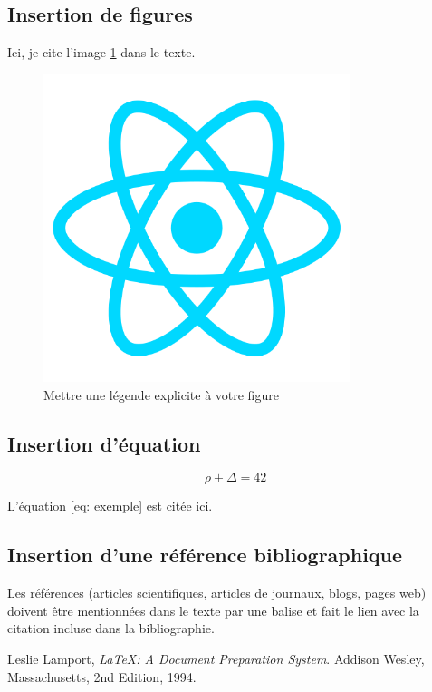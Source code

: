 \documentclass{rapportCS}
\begin{document}
\subsection{Insertion de figures}
Ici, je cite l'image \ref{fig:my_label} dans le texte.
\begin{figure}[h!]
    \centering
    \includegraphics[width=0.8\textwidth]{logos/react.png}
    \caption{Mettre une légende explicite à votre figure}
    \label{fig:my_label}
\end{figure}

\subsection{Insertion d'équation}

\begin{equation} \label{eq: exemple}
\rho + \Delta = 42
\end{equation}

L'équation \ref{eq: exemple} est citée ici. 

\subsection{Insertion d'une référence bibliographique}
Les références (articles scientifiques, articles de journaux, blogs, pages web) doivent être mentionnées dans le texte par une balise \cite{maref} et fait le lien avec la citation incluse dans la bibliographie.


\begin{thebibliography}{15} %
	  Leslie Lamport,
	  \emph{\LaTeX: A Document Preparation System}.
	  Addison Wesley, Massachusetts,
	  2nd Edition,
	  1994.
\end{thebibliography}
\end{document}

